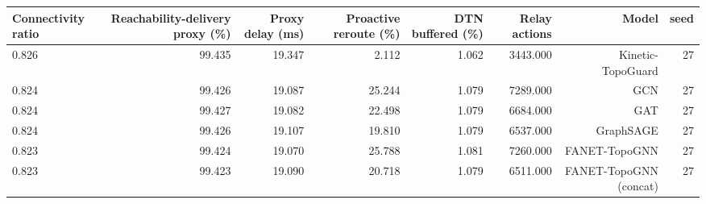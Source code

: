 \begin{tabular}{lrrrrrrr}
\toprule
Connectivity ratio & Reachability-delivery proxy (\%) & Proxy delay (ms) & Proactive reroute (\%) & DTN buffered (\%) & Relay actions & Model & seed \\
\midrule
0.826 & 99.435 & 19.347 & 2.112 & 1.062 & 3443.000 & Kinetic-TopoGuard & 27 \\
0.824 & 99.426 & 19.087 & 25.244 & 1.079 & 7289.000 & GCN & 27 \\
0.824 & 99.427 & 19.082 & 22.498 & 1.079 & 6684.000 & GAT & 27 \\
0.824 & 99.426 & 19.107 & 19.810 & 1.079 & 6537.000 & GraphSAGE & 27 \\
0.823 & 99.424 & 19.070 & 25.788 & 1.081 & 7260.000 & FANET-TopoGNN & 27 \\
0.823 & 99.423 & 19.090 & 20.718 & 1.079 & 6511.000 & FANET-TopoGNN (concat) & 27 \\
\bottomrule
\end{tabular}